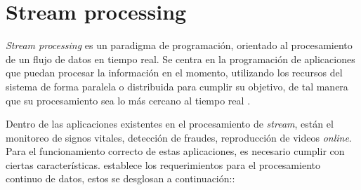 \section{Stream processing}
\label{sec:streamProcessing}

\textit{Stream processing} es un paradigma de programaci\'on, orientado al procesamiento de un flujo de datos en tiempo real. Se centra en la programaci\'on de aplicaciones que puedan procesar la informaci\'on en el momento, utilizando los recursos del sistema de forma paralela o distribuida para cumplir su objetivo, de tal manera que su procesamiento sea lo m\'as cercano al tiempo real \citep{ChakravarthyJ09}.

Dentro de las aplicaciones existentes en el procesamiento de \textit{stream}, est\'an el monitoreo de signos vitales, detecci\'on de fraudes, reproducci\'on de videos \textit{online}. Para el funcionamiento correcto de estas aplicaciones, es necesario cumplir con ciertas caracter\'isticas. \citep{andrade2014fundamentals} establece los requerimientos para el procesamiento continuo de datos, estos se desglosan a continuaci\'on::

